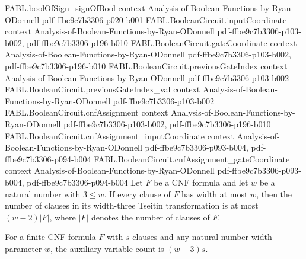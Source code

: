 \begin{theorem}
\proofstep
  {FABL.boolOfSign_signOfBool}
  {context}
  {Analysis-of-Boolean-Functions-by-Ryan-ODonnell}
  {pdf-ffbe9c7b3306-p020-b001}
\proofstep
  {FABL.BooleanCircuit.inputCoordinate}
  {context}
  {Analysis-of-Boolean-Functions-by-Ryan-ODonnell}
  {pdf-ffbe9c7b3306-p103-b002,
    pdf-ffbe9c7b3306-p196-b010}
\proofstep
  {FABL.BooleanCircuit.gateCoordinate}
  {context}
  {Analysis-of-Boolean-Functions-by-Ryan-ODonnell}
  {pdf-ffbe9c7b3306-p103-b002,
    pdf-ffbe9c7b3306-p196-b010}
\proofstep
  {FABL.BooleanCircuit.previousGateIndex}
  {context}
  {Analysis-of-Boolean-Functions-by-Ryan-ODonnell}
  {pdf-ffbe9c7b3306-p103-b002}
\proofstep
  {FABL.BooleanCircuit.previousGateIndex_val}
  {context}
  {Analysis-of-Boolean-Functions-by-Ryan-ODonnell}
  {pdf-ffbe9c7b3306-p103-b002}
\proofstep
  {FABL.BooleanCircuit.cnfAssignment}
  {context}
  {Analysis-of-Boolean-Functions-by-Ryan-ODonnell}
  {pdf-ffbe9c7b3306-p103-b002,
    pdf-ffbe9c7b3306-p196-b010}
\proofstep
  {FABL.BooleanCircuit.cnfAssignment_inputCoordinate}
  {context}
  {Analysis-of-Boolean-Functions-by-Ryan-ODonnell}
  {pdf-ffbe9c7b3306-p093-b004,
    pdf-ffbe9c7b3306-p094-b004}
\proofstep
  {FABL.BooleanCircuit.cnfAssignment_gateCoordinate}
  {context}
  {Analysis-of-Boolean-Functions-by-Ryan-ODonnell}
  {pdf-ffbe9c7b3306-p093-b004,
    pdf-ffbe9c7b3306-p094-b004}
Let $F$ be a CNF formula and let $w$ be a natural number with $3\leq w$. If every clause
of $F$ has width at most $w$, then the number of clauses in its width-three Tseitin
transformation is at most $(w-2)|F|$, where $|F|$ denotes the number of clauses of $F$.
\end{theorem}

\begin{theorem}
\label{FABL.widthThreeTseitin_auxiliaryCount_eq}
\leanok
{}
For a finite CNF formula $F$ with $s$ clauses and any natural-number width parameter
$w$, the auxiliary-variable count is $(w-3)s$.
\end{theorem}

